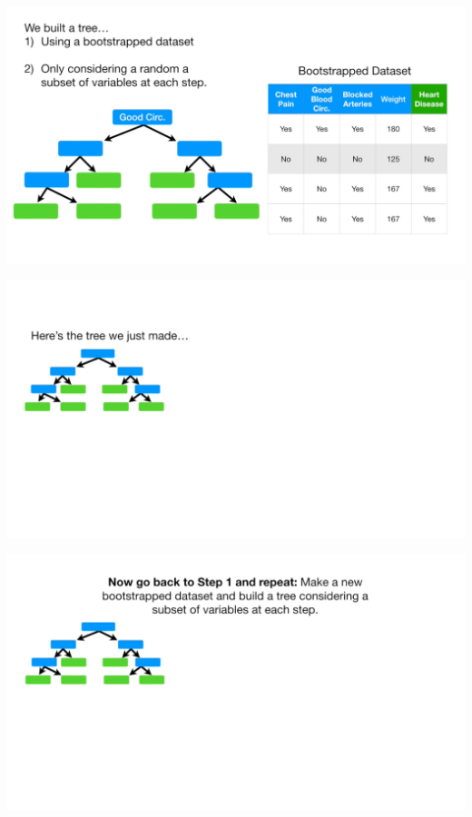 \documentclass[
  ignorenonframetext,
]{beamer}
\begin{document}
\begin{frame}{}
\protect\hypertarget{section-35}{}
\includegraphics{images/r36.png}
\end{frame}

\begin{frame}{}
\protect\hypertarget{section-36}{}
\includegraphics{images/r37.png}
\end{frame}

\begin{frame}{}
\protect\hypertarget{section-37}{}
\includegraphics{images/r38.png}
\end{frame}
\end{document}
